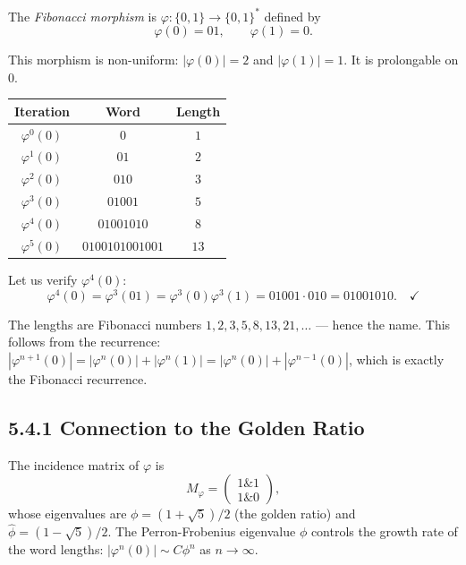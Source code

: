 \begin{definition}
The \textit{Fibonacci morphism} is $\varphi: \{ 0,1\}  \to \{ 0,1\} ^*$ defined by
\[\varphi(0) = 01, \qquad \varphi(1) = 0.\]

This morphism is non-uniform: $|\varphi(0)| = 2$ and $|\varphi(1)| = 1$. It is prolongable on $0$.
\end{definition}

\begin{example}

\begin{center}
\begin{tabular}{ccc}
\toprule
Iteration & Word & Length \\
\midrule
$\varphi^0(0)$ & $0$ & $1$ \\
$\varphi^1(0)$ & $01$ & $2$ \\
$\varphi^2(0)$ & $010$ & $3$ \\
$\varphi^3(0)$ & $01001$ & $5$ \\
$\varphi^4(0)$ & $01001010$ & $8$ \\
$\varphi^5(0)$ & $0100101001001$ & $13$ \\
\bottomrule
\end{tabular}
\end{center}

Let us verify $\varphi^4(0)$:
\[\varphi^4(0) = \varphi^3(01) = \varphi^3(0)\varphi^3(1) = 01001 \cdot 010 = 01001010. \quad\checkmark\]

The lengths are Fibonacci numbers $1, 2, 3, 5, 8, 13, 21, \ldots$ --- hence the name. This follows from the recurrence: $|\varphi^{n+1}(0)| = |\varphi^n(0)| + |\varphi^n(1)| = |\varphi^n(0)| + |\varphi^{n-1}(0)|$, which is exactly the Fibonacci recurrence.
\end{example}

\subsection{5.4.1 Connection to the Golden Ratio}

The incidence matrix of $\varphi$ is
\[M_\varphi = \begin{pmatrix} 1 \& 1 \\ 1 \& 0 \end{pmatrix},\]
whose eigenvalues are $\phi = (1+\sqrt{5})/2$ (the golden ratio) and $\hat{\phi} = (1-\sqrt{5})/2$. The Perron-Frobenius eigenvalue $\phi$ controls the growth rate of the word lengths: $|\varphi^n(0)| \sim C \phi^n$ as $n \to \infty$.

